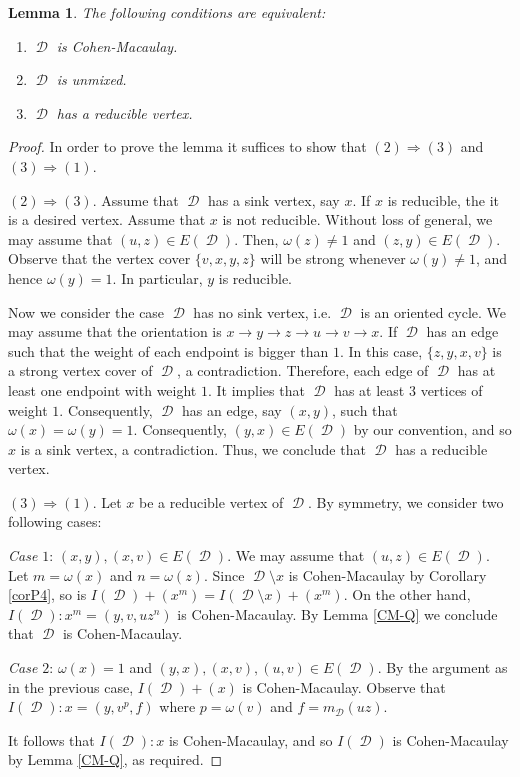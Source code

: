 \documentclass[12pt, amscd]{amsart}
\newtheorem{lem}[thm]{Lemma}
\theoremstyle{definition}
\DeclareMathOperator{\D}{\mathcal{D}}
\newcommand{\0}{\bold{0}}
\begin{document}
\begin{lem}\label{CM-C5}  The following conditions are equivalent:
\begin{enumerate}
\item $\D$ is Cohen-Macaulay.
\item $\D$ is unmixed.
\item $\D$ has a reducible vertex.
\end{enumerate}
\end{lem}
\begin{proof}  In order to prove the lemma it suffices to show that $(2) \Longrightarrow (3)$ and $(3)\Longrightarrow (1)$.

$(2)\Longrightarrow (3)$. Assume that $\D$ has a sink vertex, say $x$. If $x$ is reducible, the it is a desired vertex. Assume that $x$ is not reducible. Without loss of general, we may assume that $(u,z)\in E(\D)$. Then, $\omega(z)\ne 1$ and $(z,y)\in E(\D)$. Observe that the vertex cover $\{v,x,y,z\}$ will be strong whenever $\omega(y)\ne 1$, and hence $\omega(y)=1$. In particular, $y$ is reducible.

Now we consider the case $\D$ has no sink vertex, i.e. $\D$ is an oriented cycle. We may assume that the orientation is $x\to y\to z\to u \to v\to x$. If $\D$ has an edge such that the weight of each endpoint is bigger than $1$. In this case, $\{z,y,x,v\}$ is a strong vertex cover of $\D$, a contradiction. Therefore, each edge of $\D$ has at least one endpoint with weight $1$. It implies that $\D$ has at least $3$ vertices of weight $1$. Consequently, $\D$ has an edge, say $(x,y)$, such that $\omega(x)=\omega(y)=1$. Consequently, $(y,x)\in E(\D)$ by our convention, and so $x$ is a sink vertex, a contradiction. Thus, we conclude that $\D$ has a reducible vertex.

$(3) \Longrightarrow (1)$. Let $x$ be a reducible vertex of $\D$. By symmetry, we consider two following cases:

\medskip

{\it Case $1$}: $(x,y),(x,v)\in E(\D)$. We may assume that $(u,z)\in E(\D)$. Let $m=\omega(x)$ and $n=\omega(z)$. Since $\D \setminus x$ is Cohen-Macaulay by Corollary \ref{corP4}, so is $I(\D)+(x^m) = I(\D\setminus x)+(x^m)$. On the other hand, $I(\D) \colon x^m  = (y,v,uz^n)$ is Cohen-Macaulay. By Lemma \ref{CM-Q} we conclude that $\D$ is Cohen-Macaulay. 

\medskip

{\it Case $2$}: $\omega(x)=1$ and $(y,x), (x,v), (u,v)\in E(\D)$. By the argument as in the previous case,  $I(\D) +(x)$ is Cohen-Macaulay. Observe that $I(\D)\colon x = (y,v^p,f)$ where $p=\omega(v)$ and $f = m_{\D}(uz)$.

It follows that $I(\D)\colon x$ is Cohen-Macaulay, and so $I(\D)$ is Cohen-Macaulay by Lemma \ref{CM-Q}, as required.
\end{proof}
\end{document}
